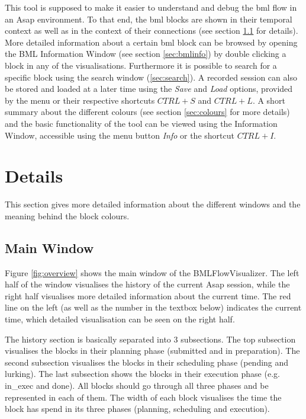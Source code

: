 \documentclass[12pt,a4paper]{article}
\begin{document}
This tool is supposed to make it easier to understand and debug the bml flow in an Asap environment. To that end, the bml blocks are shown in their temporal context as well
as in the context of their connections (see section \ref{sec:mainWin} for details). More detailed information about a certain bml block can be browsed by opening
the BML Information Window (see section \ref{sec:bmlinfo}) by double clicking a block in any of the visualisations. Furthermore it is possible to search for a specific
block using the search window (\ref{sec:search}). A recorded session can also be stored and loaded at a later time using the \textit{Save} and \textit{Load} options, 
provided by the menu or their respective shortcuts $CTRL+S$ and $CTRL+L$. A short summary about the different colours (see section \ref{sec:colours} for more details) 
and the basic functionality of the tool can be viewed using the Information Window, accessible using the menu button \textit{Info} or the shortcut $CTRL+I$.

\section{Details}

This section gives more detailed information about the different windows and the meaning behind the block colours.

\subsection{Main Window} \label{sec:mainWin}
Figure \ref{fig:overview} shows the main window of the BMLFlowVisualizer. The left half of the window visualises the history of the current Asap session, while the right
half visualises more detailed information about the current time. The red line on the left (as well as the number in the textbox below) 
indicates the current time, which detailed visualisation can be seen on the right half. 

The history section is basically separated into 3 subsections. The top subsection visualises the blocks in their planning phase (submitted and in preparation).
The second subsection visualises the blocks in their scheduling phase (pending and lurking). The last subsection shows the blocks in their execution phase 
(e.g. in\_exec and done). All blocks should go through all three phases and be represented in each of them. The width of each block visualises the time 
the block has spend in its three phases (planning, scheduling and execution). 
\end{document}
